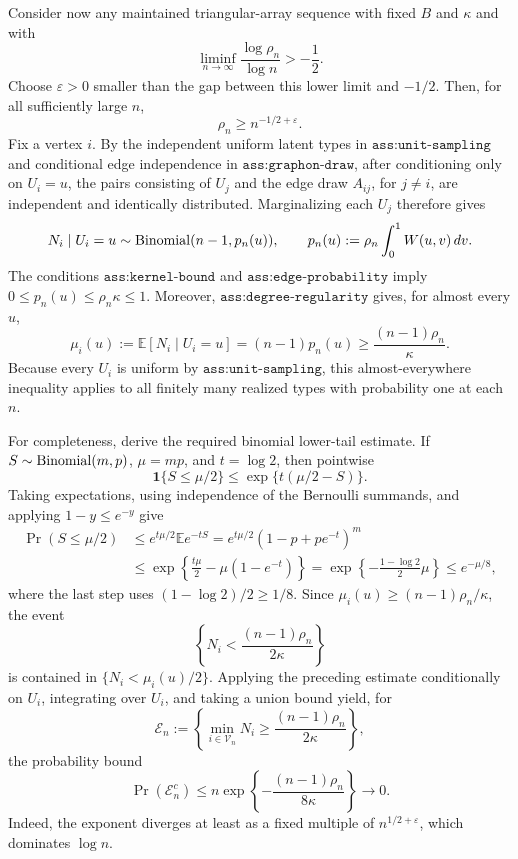 Consider now any maintained triangular-array sequence with fixed \(B\) and \(\kappa\) and with
\[
 \liminf_{n\to\infty}\frac{\log\rho_n}{\log n}>-\frac12.
\]
Choose \(\varepsilon>0\) smaller than the gap between this lower limit and \(-1/2\). Then, for all sufficiently large \(n\),
\[
 \rho_n\ge n^{-1/2+\varepsilon}.
\]
Fix a vertex \(i\). By the independent uniform latent types in \(\texttt{ass:unit-sampling}\) and conditional edge independence in \(\texttt{ass:graphon-draw}\), after conditioning only on \(U_i=u\), the pairs consisting of \(U_j\) and the edge draw \(A_{ij}\), for \(j\ne i\), are independent and identically distributed. Marginalizing each \(U_j\) therefore gives
\[
 N_i\mid U_i=u\sim {\rm Binomial}(n-1,p_n(u)),
 \qquad
 p_n(u):=\rho_n\int_0^1W(u,v)\,dv.
\]
The conditions \(\texttt{ass:kernel-bound}\) and \(\texttt{ass:edge-probability}\) imply \(0\le p_n(u)\le\rho_n\kappa\le1\). Moreover, \(\texttt{ass:degree-regularity}\) gives, for almost every \(u\),
\[
 \mu_i(u):=\mathbb E[N_i\mid U_i=u]
 =(n-1)p_n(u)
 \ge\frac{(n-1)\rho_n}{\kappa}.
\]
Because every \(U_i\) is uniform by \(\texttt{ass:unit-sampling}\), this almost-everywhere inequality applies to all finitely many realized types with probability one at each \(n\).

For completeness, derive the required binomial lower-tail estimate. If \(S\sim{\rm Binomial}(m,p)\), \(\mu=mp\), and \(t=\log2\), then pointwise
\[
 \mathbf1\{S\le\mu/2\}\le \exp\{t(\mu/2-S)\}.
\]
Taking expectations, using independence of the Bernoulli summands, and applying \(1-y\le e^{-y}\) give
\[
\begin{aligned}
 \Pr(S\le\mu/2)
 &\le e^{t\mu/2}\mathbb E e^{-tS}
 =e^{t\mu/2}(1-p+pe^{-t})^m\\
 &\le\exp\!\left\{\frac{t\mu}{2}-\mu(1-e^{-t})\right\}
 =\exp\!\left\{-\frac{1-\log2}{2}\mu\right\}
 \le e^{-\mu/8},
\end{aligned}
\]
where the last step uses \((1-\log2)/2\ge1/8\). Since \(\mu_i(u)\ge(n-1)\rho_n/\kappa\), the event
\[
 \left\{N_i<\frac{(n-1)\rho_n}{2\kappa}\right\}
\]
is contained in \(\{N_i<\mu_i(u)/2\}\). Applying the preceding estimate conditionally on \(U_i\), integrating over \(U_i\), and taking a union bound yield, for
\[
 \mathcal E_n:=\left\{\min_{i\in\mathcal V_n}N_i
 \ge\frac{(n-1)\rho_n}{2\kappa}\right\},
\]
the probability bound
\[
 \Pr(\mathcal E_n^c)
 \le n\exp\!\left\{-\frac{(n-1)\rho_n}{8\kappa}\right\}
 \longrightarrow0.
\]
Indeed, the exponent diverges at least as a fixed multiple of \(n^{1/2+\varepsilon}\), which dominates \(\log n\).

